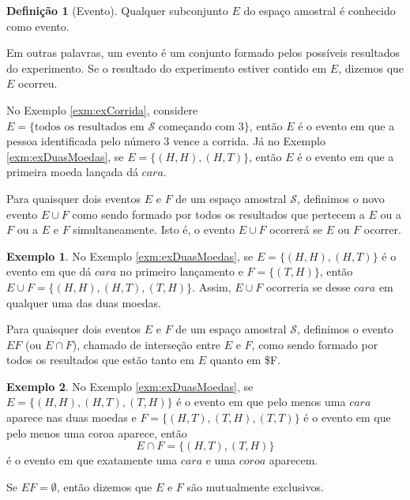 \documentclass[]{book}
\theoremstyle{definition}
\newtheorem{definition}{Definição}[chapter]
\theoremstyle{definition}
\newtheorem{example}{Exemplo}[chapter]
\theoremstyle{definition}
\theoremstyle{remark}
\begin{document}
\begin{definition}[Evento]
\protect\hypertarget{def:defEvento}{}{\label{def:defEvento} \iffalse (Evento) \fi{} }Qualquer subconjunto \(E\) do espaço amostral é conhecido como evento.
\end{definition}

Em outras palavras, um evento é um conjunto formado pelos possíveis resultados do experimento.
Se o resultado do experimento estiver contido em \(E\), dizemos que \(E\) ocorreu.

No Exemplo \ref{exm:exCorrida}, considere \(E=\{\text{todos os resultados em $\mathcal{S}$ começando com $3$}\}\), então \(E\) é o evento em que a pessoa identificada pelo número \(3\) vence a corrida.
Já no Exemplo \ref{exm:exDuasMoedas}, se \(E=\{(H,H),(H,T)\}\), então \(E\) é o evento em que a primeira moeda lançada dá \(cara\).

Para quaisquer dois eventos \(E\) e \(F\) de um espaço amostral \(\mathcal{S}\), definimos o novo evento \(E\cup F\) como sendo formado por todos os resultados que pertecem a \(E\) ou a \(F\) ou a \(E\) e \(F\) simultaneamente.
Isto é, o evento \(E\cup F\) ocorrerá se \(E\) ou \(F\) ocorrer.

\begin{example}
\protect\hypertarget{exm:unnamed-chunk-116}{}{\label{exm:unnamed-chunk-116} }No Exemplo \ref{exm:exDuasMoedas}, se \(E=\{(H,H),(H,T)\}\) é o evento em que dá \(cara\) no primeiro lançamento e \(F=\{(T,H)\}\), então
\(E\cup F=\{(H,H),(H,T),(T,H)\}\).
Assim, \(E\cup F\) ocorreria se desse \(cara\) em qualquer uma das duas moedas.
\end{example}

Para quaisquer dois eventos \(E\) e \(F\) de um espaço amostral \(\mathcal{S}\), definimos o evento \(EF\) (ou \(E\cap F\)), chamado de interseção entre \(E\) e \(F\), como sendo formado por todos os resultados que estão tanto em \(E\) quanto em \$F.

\begin{example}
\protect\hypertarget{exm:unnamed-chunk-117}{}{\label{exm:unnamed-chunk-117} }No Exemplo \ref{exm:exDuasMoedas}, se \(E=\{(H,H),(H,T),(T,H)\}\) é o evento em que pelo menos uma \(cara\) aparece nas duas moedas e \(F=\{(H,T),(T,H),(T,T)\}\) é o evento em que pelo menos uma coroa aparece, então
\[E\cap F=\{(H,T),(T,H)\}\]
é o evento em que exatamente uma \(cara\) e uma \(coroa\) aparecem.
\end{example}

Se \(EF=\emptyset\), então dizemos que \(E\) e \(F\) são mutualmente exclusivos.
\end{document}
